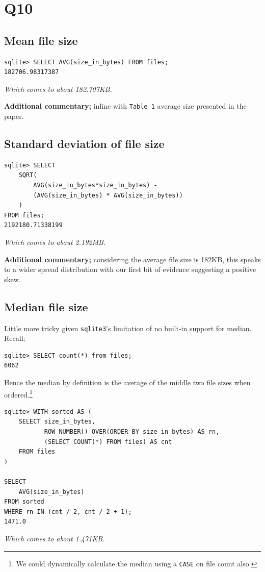 \documentclass{article}
\begin{document}
\section*{Q10}
\subsection*{Mean file size}
\begin{small}
\begin{verbatim}
sqlite> SELECT AVG(size_in_bytes) FROM files;
182706.98317387
\end{verbatim}
\end{small}
\textit{Which comes to about 182.707KB.}

\textbf{Additional commentary;} inline with \texttt{Table 1} average size presented in the paper.

\subsection*{Standard deviation of file size}
\begin{small}
\begin{verbatim}
sqlite> SELECT 
    SQRT(
        AVG(size_in_bytes*size_in_bytes) - 
        (AVG(size_in_bytes) * AVG(size_in_bytes))
    )
FROM files;
2192180.71338199
\end{verbatim}
\end{small}
\textit{Which comes to about 2.192MB.}

\textbf{Additional commentary;} considering the average file size is 182KB, this speaks to a wider spread distribution with our first bit of evidence suggesting a positive skew. 

\subsection*{Median file size}
Little more tricky given \texttt{sqlite3}'s limitation of no built-in support for median. Recall;
\begin{small}
\begin{verbatim}
sqlite> SELECT count(*) from files;
6062
\end{verbatim}
\end{small}
Hence the median by definition is the average of the middle two file sizes when ordered.\footnote{We could dynamically calculate the median using a \texttt{CASE} on file count also.}
\begin{small}
\begin{verbatim}
sqlite> WITH sorted AS (
    SELECT size_in_bytes,
           ROW_NUMBER() OVER(ORDER BY size_in_bytes) AS rn,
           (SELECT COUNT(*) FROM files) AS cnt
    FROM files
)

SELECT 
    AVG(size_in_bytes)
FROM sorted
WHERE rn IN (cnt / 2, cnt / 2 + 1);
1471.0
\end{verbatim}
\end{small}
\textit{Which comes to about 1.471KB.}
\end{document}
